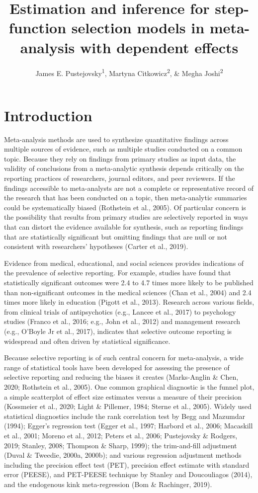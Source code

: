 \documentclass[
  man, donotrepeattitle,floatsintext]{apa7}
\title{Estimation and inference for step-function selection models in meta-analysis with dependent effects}
\author{James E. Pustejovsky\textsuperscript{1}, Martyna Citkowicz\textsuperscript{2}, \& Megha Joshi\textsuperscript{2}}
\date{}
\affiliation{\vspace{0.5cm}\textsuperscript{1} University of Wisconsin-Madison\\\textsuperscript{2} American Institutes for Research}
\begin{document}
\maketitle

\section{Introduction}\label{introduction}

Meta-analysis methods are used to synthesize quantitative findings across multiple sources of evidence, such as multiple studies conducted on a common topic.
Because they rely on findings from primary studies as input data, the validity of conclusions from a meta-analytic synthesis depends critically on the reporting practices of researchers, journal editors, and peer reviewers.
If the findings accessible to meta-analysts are not a complete or representative record of the research that has been conducted on a topic, then meta-analytic summaries could be systematically biased (Rothstein et al., 2005).
Of particular concern is the possibility that results from primary studies are selectively reported in ways that can distort the evidence available for synthesis, such as reporting findings that are statistically significant but omitting findings that are null or not consistent with researchers' hypotheses (Carter et al., 2019).

Evidence from medical, educational, and social sciences provides indications of the prevalence of selective reporting. For example, studies have found that statistically significant outcomes were 2.4 to 4.7 times more likely to be published than non-significant outcomes in the medical sciences (Chan et al., 2004) and 2.4 times more likely in education (Pigott et al., 2013). Research across various fields, from clinical trials of antipsychotics (e.g., Lancee et al., 2017) to psychology studies (Franco et al., 2016; e.g., John et al., 2012) and management research (e.g., O'Boyle Jr et al., 2017), indicates that selective outcome reporting is widespread and often driven by statistical significance.

Because selective reporting is of such central concern for meta-analysis, a wide range of statistical tools have been developed for assessing the presence of selective reporting and reducing the biases it creates (Marks‐Anglin \& Chen, 2020; Rothstein et al., 2005).
One common graphical diagnostic is the funnel plot, a simple scatterplot of effect size estimates versus a measure of their precision (Kossmeier et al., 2020; Light \& Pillemer, 1984; Sterne et al., 2005). Widely used statistical diagnostics include the rank correlation test by Begg and Mazumdar (1994); Egger's regression test (Egger et al., 1997; Harbord et al., 2006; Macaskill et al., 2001; Moreno et al., 2012; Peters et al., 2006; Pustejovsky \& Rodgers, 2019; Stanley, 2008; Thompson \& Sharp, 1999); the trim-and-fill adjustment (Duval \& Tweedie, 2000a, 2000b); and various regression adjustment methods including the precision effect test (PET), precision effect estimate with standard error (PEESE), and PET-PEESE technique by Stanley and Doucouliagos (2014), and the endogenous kink meta-regression (Bom \& Rachinger, 2019).
\end{document}
